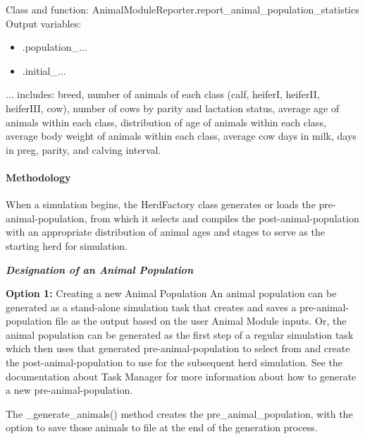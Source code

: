 \documentclass{article}
\begin{document}
\begin{refsection}
Class and function: AnimalModuleReporter.report\_animal\_population\_statistics
Output variables: 
\begin{itemize}
    \item .population\_{...}
    \item .initial\_{...}
\end{itemize}

{...} includes: breed, number of animals of each class (calf, heiferI, heiferII, heiferIII, cow), number of cows by parity and lactation status, average age of animals within each class, distribution of age of animals within each class, average body weight of animals within each class, average cow days in milk, days in preg, parity, and calving interval. 




\paragraph{Methodology}

When a simulation begins, the HerdFactory class generates or loads the pre-animal-population, from which it selects and compiles the post-animal-population with an appropriate distribution of animal ages and stages to serve as the starting herd for simulation. 
\vspace{0.3cm}

\textbf{\textit{Designation of an Animal Population}}
\vspace{0.3cm}

\textbf{Option 1:} Creating a new Animal Population
An animal population can be generated as a stand-alone simulation task that creates and saves a pre-animal-population file  as the output based on the user Animal Module inputs. Or, the animal population can be generated as the first step of a regular simulation task which then uses that generated pre-animal-population to select from and create the post-animal-population to use for the subsequent herd simulation. See the documentation about Task Manager for more information about how to generate a new pre-animal-population. 
\vspace{0.2cm}

The \_generate\_animals() method creates the pre\_animal\_population, with the option to save those animals to file at the end of the generation process. 
\vspace{0.2cm}


\end{refsection}
\end{document}
